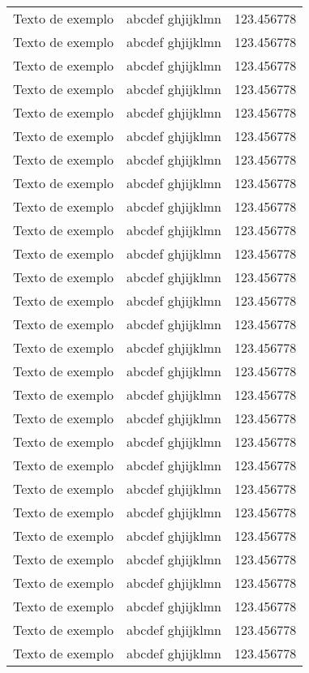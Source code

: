 {\begin{longtable}{l|r|c}
  Texto de exemplo & abcdef ghjijklmn & 123.456778 \\
  Texto de exemplo & abcdef ghjijklmn & 123.456778 \\
  Texto de exemplo & abcdef ghjijklmn & 123.456778 \\
  Texto de exemplo & abcdef ghjijklmn & 123.456778 \\
  Texto de exemplo & abcdef ghjijklmn & 123.456778 \\
  Texto de exemplo & abcdef ghjijklmn & 123.456778 \\
  Texto de exemplo & abcdef ghjijklmn & 123.456778 \\
  Texto de exemplo & abcdef ghjijklmn & 123.456778 \\
  Texto de exemplo & abcdef ghjijklmn & 123.456778 \\
  Texto de exemplo & abcdef ghjijklmn & 123.456778 \\
  Texto de exemplo & abcdef ghjijklmn & 123.456778 \\
  Texto de exemplo & abcdef ghjijklmn & 123.456778 \\
  Texto de exemplo & abcdef ghjijklmn & 123.456778 \\
  Texto de exemplo & abcdef ghjijklmn & 123.456778 \\
  Texto de exemplo & abcdef ghjijklmn & 123.456778 \\
  Texto de exemplo & abcdef ghjijklmn & 123.456778 \\
  Texto de exemplo & abcdef ghjijklmn & 123.456778 \\
  Texto de exemplo & abcdef ghjijklmn & 123.456778 \\
  Texto de exemplo & abcdef ghjijklmn & 123.456778 \\
  Texto de exemplo & abcdef ghjijklmn & 123.456778 \\
  Texto de exemplo & abcdef ghjijklmn & 123.456778 \\
  Texto de exemplo & abcdef ghjijklmn & 123.456778 \\
  Texto de exemplo & abcdef ghjijklmn & 123.456778 \\
  Texto de exemplo & abcdef ghjijklmn & 123.456778 \\
  Texto de exemplo & abcdef ghjijklmn & 123.456778 \\
  Texto de exemplo & abcdef ghjijklmn & 123.456778 \\
  Texto de exemplo & abcdef ghjijklmn & 123.456778 \\
  Texto de exemplo & abcdef ghjijklmn & 123.456778 \\

\end{longtable}}
